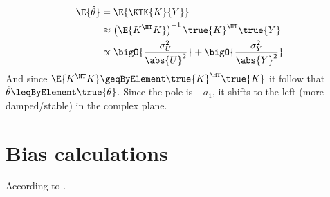 \begin{align}
  \E{\hat{\theta}} &= \E{\KTK{K}{Y}} \\
                   &\approx 
                      \left(\E{K^{\HT}K}\right)^{-1} \true{K}^{\HT} \true{Y} \\
                   &\propto
                   \bigO{\frac{\sigma_U^2}{\abs{U}^2}} + \bigO{\frac{\sigma_Y^2}{\abs{Y}^2}}
\end{align}
And since $\E{K^{\HT}K} \geqByElement \true{K}^{\HT}\true{K}$ it follow that $\hat{\theta} \leqByElement \true{\theta}$.
Since the pole is $-a_1$, it shifts to the left (more damped/stable) in the complex plane.

\section{Bias calculations}
According to \cite[Appendix A]{Guillaume1995}.

